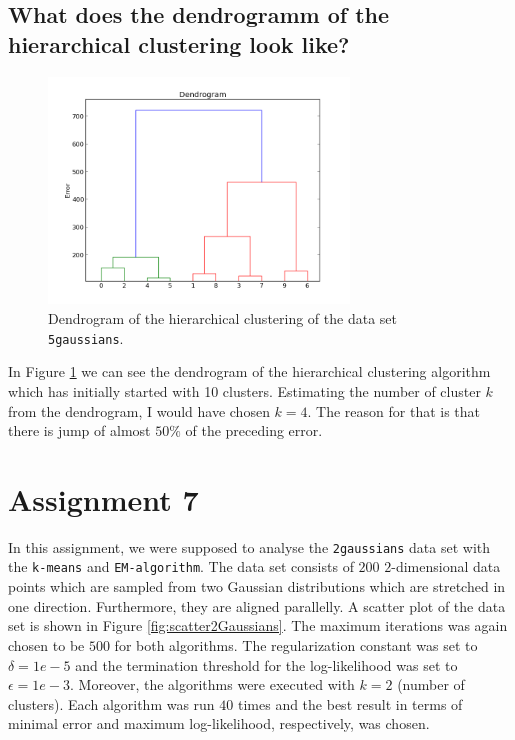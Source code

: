 \documentclass[a4paper, 12pt, titlepage]{article}
\begin{document}
\subsection{What does the dendrogramm of the hierarchical clustering look like?}

\begin{figure}
	\centering
	\includegraphics[width=8cm]{images/dendrogram5Gaussians.png}
	\caption{Dendrogram of the hierarchical clustering of the data set \texttt{5gaussians}.}
	\label{fig:dendrogram5Gaussians}
\end{figure}

In Figure \ref{fig:dendrogram5Gaussians} we can see the dendrogram of the hierarchical clustering algorithm which has initially started with 10 clusters.
Estimating the number of cluster $k$ from the dendrogram, I would have chosen $k=4$.
The reason for that is that there is jump of almost $50\%$ of the preceding error.

\section{Assignment 7}

In this assignment, we were supposed to analyse the \texttt{2gaussians} data set with the \texttt{k-means} and \texttt{EM-algorithm}.
The data set consists of $200$ $2$-dimensional data points which are sampled from two Gaussian distributions which are stretched in one direction.
Furthermore, they are aligned parallelly.
A scatter plot of the data set is shown in Figure \ref{fig:scatter2Gaussians}.
The maximum iterations was again chosen to be $500$ for both algorithms.
The regularization constant was set to $\delta=1e-5$ and the termination threshold for the log-likelihood was set to $\epsilon=1e-3$.
Moreover, the algorithms were executed with $k=2$ (number of clusters).
Each algorithm was run $40$ times and the best result in terms of minimal error and maximum log-likelihood, respectively, was chosen.
\end{document}
